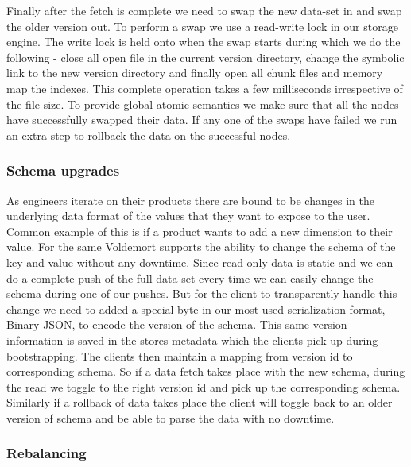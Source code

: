 \documentclass[10pt,twocolumn,preprint,natbib,authoryear]{sigplanconf}
\begin{document}
Finally after the fetch is complete we need to swap the new data-set in and swap the older version out. To perform a swap we use a read-write lock in our storage engine. The write lock is held onto when the swap starts during which we do the following - close all open file in the current version directory, change the symbolic link to the new version directory and finally open all chunk files and memory map the indexes. This complete operation takes a few milliseconds irrespective of the file size. To provide global atomic semantics we make sure that all the nodes have successfully swapped their data. If any one of the swaps have failed we run an extra step to rollback the data on the successful nodes. 



\subsubsection{Schema upgrades}
\label{sec:read_only:data_cycle:schema_upgrades}

As engineers iterate on their products there are bound to be changes in the underlying data format of the values that they want to expose to the user. Common example of this is if a product wants to add a new dimension to their value. For the same Voldemort supports the ability to change the schema of the key and value without any downtime. Since read-only data is static and we can do a complete push of the full data-set every time we can easily change the schema during one of our pushes. But for the client to transparently handle this change we need to added a special byte in our most used serialization format, Binary JSON, to encode the version of the schema. This same version information is saved in the stores metadata which the clients pick up during bootstrapping. The clients then maintain a mapping from version id to corresponding schema. So if a data fetch takes place with the new schema, during the read we toggle to the right version id and pick up the corresponding schema. Similarly if a rollback of data takes place the client will toggle back to an older version of schema and be able to parse the data with no downtime. 


\subsubsection{Rebalancing}
\label{sec:read_only:data_cycle:rebalancing}
\end{document}
